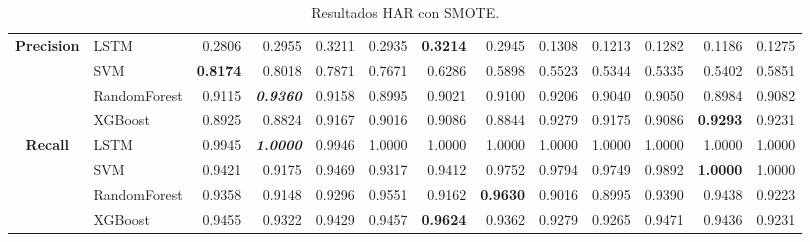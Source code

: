 \begin{table}[H]
\begin{adjustbox}{max width=14cm}
\begin{tabular}{|c|l|r|r|r|r|r|r|r|r|r|r|r|}
			\hline
			\textbf{Precision} &  LSTM &  0.2806 &  0.2955 &  0.3211 &  0.2935 & \textbf{  0.3214 } &  0.2945 &  0.1308 &  0.1213 &  0.1282 &  0.1186 &  0.1275 \\
			&  SVM & \textbf{  0.8174 } &  0.8018 &  0.7871 &  0.7671 &  0.6286 &  0.5898 &  0.5523 &  0.5344 &  0.5335 &  0.5402 &  0.5851 \\
			&  RandomForest &  0.9115 & \textit{ \textbf{  0.9360 } } &  0.9158 &  0.8995 &  0.9021 &  0.9100 &  0.9206 &  0.9040 &  0.9050 &  0.8984 &  0.9082 \\
			&  XGBoost &  0.8925 &  0.8824 &  0.9167 &  0.9016 &  0.9086 &  0.8844 &  0.9279 &  0.9175 &  0.9086 & \textbf{  0.9293 } &  0.9231 \\
			\hline
			\textbf{Recall} &  LSTM &  0.9945 & \textit{ \textbf{  1.0000 } } &  0.9946 &  1.0000 &  1.0000 &  1.0000 &  1.0000 &  1.0000 &  1.0000 &  1.0000 &  1.0000 \\
			&  SVM &  0.9421 &  0.9175 &  0.9469 &  0.9317 &  0.9412 &  0.9752 &  0.9794 &  0.9749 &  0.9892 & \textbf{  1.0000 } &  1.0000 \\
			&  RandomForest &  0.9358 &  0.9148 &  0.9296 &  0.9551 &  0.9162 & \textbf{  0.9630 } &  0.9016 &  0.8995 &  0.9390 &  0.9438 &  0.9223 \\
			&  XGBoost &  0.9455 &  0.9322 &  0.9429 &  0.9457 & \textbf{  0.9624 } &  0.9362 &  0.9279 &  0.9265 &  0.9471 &  0.9436 &  0.9231 \\
			\hline
		\end{tabular}
	\end{adjustbox}
	\caption{Resultados HAR con SMOTE.}
	\label{tab:HAR_SMOTE}
\end{table}

